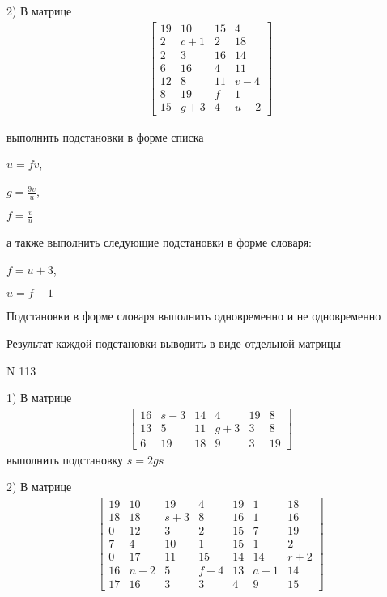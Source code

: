 \documentclass[11pt]{report}
\begin{document}
    2) В матрице
\begin{align*}
\left[\begin{matrix}19 & 10 & 15 & 4\\2 & c + 1 & 2 & 18\\2 & 3 & 16 & 14\\6 & 16 & 4 & 11\\12 & 8 & 11 & v - 4\\8 & 19 & f & 1\\15 & g + 3 & 4 & u - 2\end{matrix}\right]
\end{align*}

выполнить подстановки в форме списка

$u=f v$,

$g=\frac{9 v}{u}$,

$f=\frac{v}{u}$

а также выполнить следующие подстановки в форме словаря:

$f=u + 3$,

$u=f - 1$


    Подстановки в форме словаря выполнить одновременно и не одновременно


    Результат каждой подстановки выводить в виде отдельной матрицы

\newpage
N 113


    1) В матрице
\begin{align*}
\left[\begin{matrix}16 & s - 3 & 14 & 4 & 19 & 8\\13 & 5 & 11 & g + 3 & 3 & 8\\6 & 19 & 18 & 9 & 3 & 19\end{matrix}\right]
\end{align*}
выполнить подстановку $s=2 g s$


    2) В матрице
\begin{align*}
\left[\begin{matrix}19 & 10 & 19 & 4 & 19 & 1 & 18\\18 & 18 & s + 3 & 8 & 16 & 1 & 16\\0 & 12 & 3 & 2 & 15 & 7 & 19\\7 & 4 & 10 & 1 & 15 & 1 & 2\\0 & 17 & 11 & 15 & 14 & 14 & r + 2\\16 & n - 2 & 5 & f - 4 & 13 & a + 1 & 14\\17 & 16 & 3 & 3 & 4 & 9 & 15\end{matrix}\right]
\end{align*}
\end{document}
